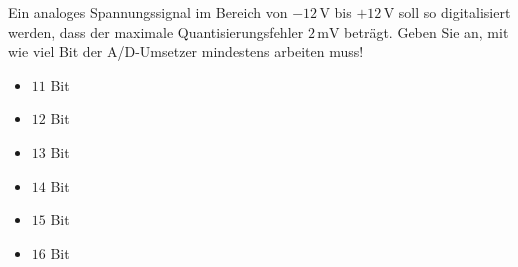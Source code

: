 \documentclass[
]{book}
\providecommand{\tightlist}{%
  \setlength{\itemsep}{0pt}\setlength{\parskip}{0pt}}
\begin{document}
Ein analoges Spannungssignal im Bereich von \(-12\,\mathrm V\) bis \(+12\,\mathrm V\) soll so digitalisiert werden, dass der maximale Quantisierungsfehler \(2\,\mathrm{mV}\) beträgt. Geben Sie an, mit wie viel Bit der A/D-Umsetzer mindestens arbeiten muss!

\begin{itemize}
\tightlist
\item
  \(11\) Bit
\item
  \(12\) Bit
\item
  \(13\) Bit
\item
  \(14\) Bit
\item
  \(15\) Bit
\item
  \(16\) Bit
\end{itemize}

\backmatter
\end{document}
